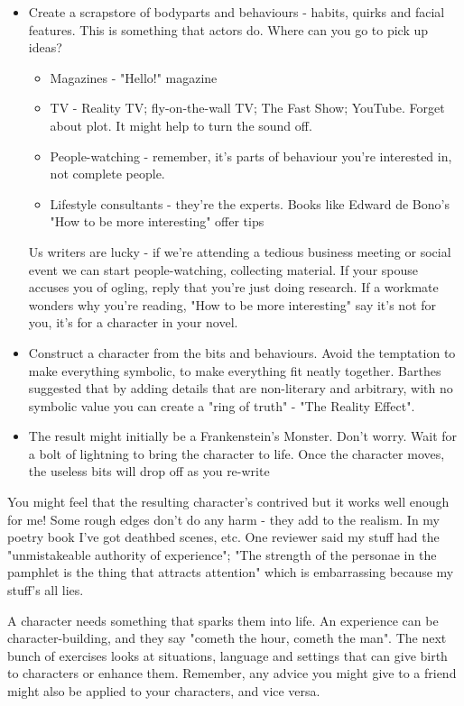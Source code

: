 \documentclass[11pt]{article}
\begin{document}
\begin{itemize}
\item  Create a scrapstore of bodyparts and behaviours - habits, quirks and facial features. This is something that actors do.
Where can you go to pick up ideas? 
\begin{itemize}
\item  Magazines - "Hello!" magazine
\item  TV - Reality TV; fly-on-the-wall TV; The Fast Show; YouTube. Forget about plot. It might help to turn the sound off.
\item  People-watching - remember, it's parts of behaviour you're interested in, not complete people.  
\item  Lifestyle consultants - they're the experts. Books like Edward de Bono's "How to be more interesting" offer tips 
\end{itemize}
Us writers are lucky - if we're attending a tedious business meeting or social event we can start people-watching, collecting material.
If your spouse accuses you of ogling, reply that you're just doing research. If a workmate wonders why you're reading, "How to be more interesting" say it's not for you, it's for a character in your novel.

\item  Construct a character from the bits and behaviours. Avoid the temptation to make everything symbolic, to make everything fit neatly together. Barthes suggested that by adding details that are non-literary and arbitrary, with no symbolic value you can create a "ring of truth" - "The Reality Effect".

\item  The result might initially be a Frankenstein's Monster. Don't worry. Wait for a bolt of lightning to bring the character to life. Once the character moves, the useless bits will drop off as you re-write
\end{itemize}

You might feel that the resulting character's contrived but it works well
enough for me! Some rough edges don't do any harm - they add to the realism.
In my poetry book I've got deathbed scenes, etc. One reviewer said my stuff had the "unmistakeable authority of experience"; "The strength of the personae in the pamphlet is the thing that attracts attention" which is embarrassing because my stuff's all lies. 




A character needs something that sparks them into life. An experience can be character-building, and they say "cometh the hour, cometh the man". The next bunch of exercises looks at situations, language and settings that can give birth to characters or enhance them. Remember, any advice you might give to a friend might also be applied to your characters, and vice versa.
\end{document}
